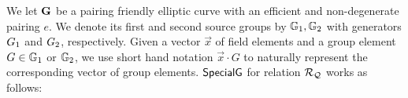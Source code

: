 \noindent We let ${\mathbf{G}}$ be a pairing friendly elliptic curve with an efficient and 
non-degenerate pairing $e$. We denote its first  and second source groups by $ \mathbb{G}_1,\mathbb{G}_2 $ with generators 
${G}_1$ and ${G}_2$, respectively.
Given a vector $ \vec{x} $ of field elements  and a group element $ G \in \mathbb{G}_1 $ or $ \mathbb{G}_2 $, we use short hand notation $ \vec{x} \cdot G $ to naturally represent the corresponding vector of group elements.
$ {\mathsf{SpecialG}} $ for relation $\mathcal{R}_{\mathcal{Q}}$ works as follows: %
